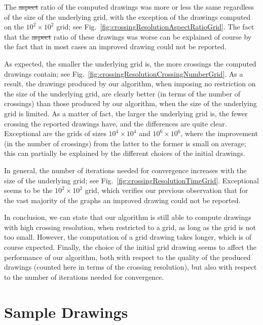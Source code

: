 \documentclass{comjnl}
\providecommand{\DIFaddtex}[1]{{\protect\color{blue}\uwave{#1}}} %
\providecommand{\DIFdeltex}[1]{{\protect\color{red}\sout{#1}}}                      %
\providecommand{\DIFaddbegin}{} %
\providecommand{\DIFaddend}{} %
\providecommand{\DIFdelbegin}{} %
\providecommand{\DIFdelend}{} %
\providecommand{\DIFadd}[1]{\texorpdfstring{\DIFaddtex{#1}}{#1}} %
\providecommand{\DIFdel}[1]{\texorpdfstring{\DIFdeltex{#1}}{}} %
\newcommand{\DIFscaledelfig}{0.5}
\newlength{\DIFdelgraphicswidth} %
\newlength{\DIFdelgraphicsheight} %
\newcommand{\DIFaddincludegraphics}[2][]{{\color{blue}\fbox{\DIFOincludegraphics[#1]{#2}}}} %
\newcommand{\DIFdelincludegraphics}[2][]{%
\sbox{\DIFdelgraphicsbox}{\DIFOincludegraphics[#1]{#2}}%
\settoboxwidth{\DIFdelgraphicswidth}{\DIFdelgraphicsbox} %
\settoboxtotalheight{\DIFdelgraphicsheight}{\DIFdelgraphicsbox} %
\scalebox{\DIFscaledelfig}{%
\parbox[b]{\DIFdelgraphicswidth}{\usebox{\DIFdelgraphicsbox}\\[-\baselineskip] \rule{\DIFdelgraphicswidth}{0em}}\llap{\resizebox{\DIFdelgraphicswidth}{\DIFdelgraphicsheight}{%
\setlength{\unitlength}{\DIFdelgraphicswidth}%
\begin{picture}(1,1)%
\thicklines\linethickness{2pt} %
{\color[rgb]{1,0,0}\put(0,0){\framebox(1,1){}}}%
{\color[rgb]{1,0,0}\put(0,0){\line( 1,1){1}}}%
{\color[rgb]{1,0,0}\put(0,1){\line(1,-1){1}}}%
\end{picture}%
}\hspace*{3pt}}} %
} %
\DeclareRobustCommand{\DIFaddbegin}{\DIFOaddbegin \let\includegraphics\DIFaddincludegraphics} %
\DeclareRobustCommand{\DIFaddend}{\DIFOaddend \let\includegraphics\DIFOincludegraphics} %
\DeclareRobustCommand{\DIFdelbegin}{\DIFOdelbegin \let\includegraphics\DIFdelincludegraphics} %
\DeclareRobustCommand{\DIFdelend}{\DIFOaddend \let\includegraphics\DIFOincludegraphics} %
\begin{document}
The \DIFdelbegin \DIFdel{aspect }\DIFdelend \DIFaddbegin \DIFadd{edge-length }\DIFaddend ratio of the computed drawings was more or less the same regardless of the size of the underlying grid, with the exception of the drawings computed on the $10^2 \times 10^2$ grid; see Fig.~\ref{fig:crossingResolutionAspectRatioGrid}. The fact that the \DIFdelbegin \DIFdel{aspect }\DIFdelend \DIFaddbegin \DIFadd{edge-length }\DIFaddend ratio of these drawings was worse can be explained of course by the fact that in most cases an improved drawing could not be reported.

As expected, the smaller the underlying grid is, the more crossings the computed drawings contain; see Fig.~\ref{fig:crossingResolutionCrossingNumberGrid}. As a result, the drawings produced by our algorithm, when imposing no restriction on the size of the underlying grid, are clearly better (in terms of the number of crossings) than those produced by our algorithm, when the size of the underlying grid is limited. As a matter of fact, the larger the underlying grid is, the fewer crossing the reported drawings have, and the differences are quite clear. Exceptional are the grids of sizes $10^4 \times 10^4$ and $10^6 \times 10^6$, where the improvement (in the number of crossings) from the latter to the former is small on average; this can partially be explained by the different choices of the initial drawings.

In general, the number of iterations needed for convergence increases with the size of the underlying grid; see Fig.~\ref{fig:crossingResolutionTimeGrid}. Exceptional seems to be the $10^2 \times 10^2$ grid, which verifies our previous observation that for the vast majority of the graphs an improved drawing could not be reported.

In conclusion, we can state that our algorithm is still able to compute drawings with high crossing resolution, when restricted to a grid, as long as the grid is not too small. However, the computation of a grid drawing takes longer, which is of course expected. Finally, the choice of the initial grid drawing seems to affect the performance of our algorithm, both with respect to the quality of the produced drawings (counted here in terms of the crossing resolution), but also with respect to the number of iterations needed for convergence.

\section{Sample Drawings}
\DIFdelbegin %
\DIFdelend \DIFaddbegin \label{sec:samples}
\DIFaddend 
\end{document}
